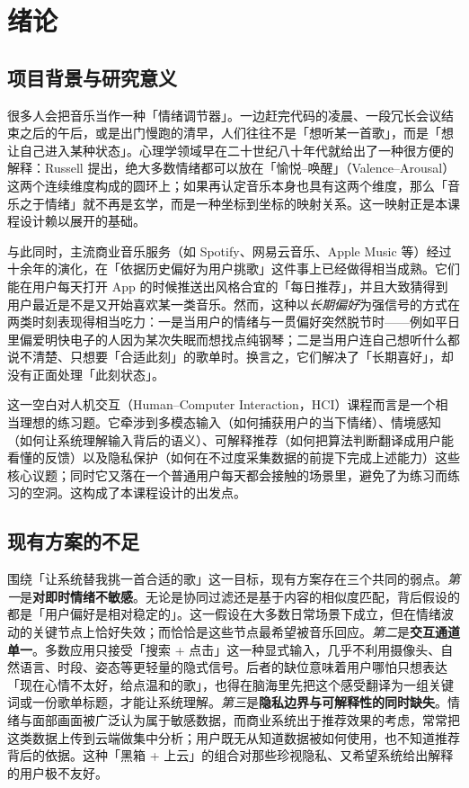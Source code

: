 \chapter{绪论}\label{chap:introduction}

\section{项目背景与研究意义}

很多人会把音乐当作一种「情绪调节器」。一边赶完代码的凌晨、一段冗长会议结束之后的午后，或是出门慢跑的清早，人们往往不是「想听某一首歌」，而是「想让自己进入某种状态」。心理学领域早在二十世纪八十年代就给出了一种很方便的解释：Russell 提出，绝大多数情绪都可以放在「愉悦--唤醒」（Valence--Arousal）这两个连续维度构成的圆环上\cite{russell1980circumplex}；如果再认定音乐本身也具有这两个维度，那么「音乐之于情绪」就不再是玄学，而是一种坐标到坐标的映射关系。这一映射正是本课程设计赖以展开的基础。

与此同时，主流商业音乐服务（如 Spotify、网易云音乐、Apple Music 等）经过十余年的演化，在「依据历史偏好为用户挑歌」这件事上已经做得相当成熟\cite{ricci2015recommender}。它们能在用户每天打开 App 的时候推送出风格合宜的「每日推荐」，并且大致猜得到用户最近是不是又开始喜欢某一类音乐。然而，这种以\emph{长期偏好}为强信号的方式在两类时刻表现得相当吃力：一是当用户的情绪与一贯偏好突然脱节时——例如平日里偏爱明快电子的人因为某次失眠而想找点纯钢琴；二是当用户连自己想听什么都说不清楚、只想要「合适此刻」的歌单时。换言之，它们解决了「长期喜好」，却没有正面处理「此刻状态」。

这一空白对人机交互（Human--Computer Interaction，HCI）课程而言是一个相当理想的练习题。它牵涉到多模态输入（如何捕获用户的当下情绪）、情境感知（如何让系统理解输入背后的语义）、可解释推荐（如何把算法判断翻译成用户能看懂的反馈）以及隐私保护（如何在不过度采集数据的前提下完成上述能力）这些核心议题；同时它又落在一个普通用户每天都会接触的场景里，避免了为练习而练习的空洞。这构成了本课程设计的出发点。

\section{现有方案的不足}

围绕「让系统替我挑一首合适的歌」这一目标，现有方案存在三个共同的弱点。\emph{第一}是\textbf{对即时情绪不敏感}。无论是协同过滤还是基于内容的相似度匹配，背后假设的都是「用户偏好是相对稳定的」。这一假设在大多数日常场景下成立，但在情绪波动的关键节点上恰好失效；而恰恰是这些节点最希望被音乐回应。\emph{第二}是\textbf{交互通道单一}。多数应用只接受「搜索 + 点击」这一种显式输入，几乎不利用摄像头、自然语言、时段、姿态等更轻量的隐式信号。后者的缺位意味着用户哪怕只想表达「现在心情不太好，给点温和的歌」，也得在脑海里先把这个感受翻译为一组关键词或一份歌单标题，才能让系统理解。\emph{第三}是\textbf{隐私边界与可解释性的同时缺失}。情绪与面部画面被广泛认为属于敏感数据，而商业系统出于推荐效果的考虑，常常把这类数据上传到云端做集中分析；用户既无从知道数据被如何使用，也不知道推荐背后的依据。这种「黑箱 + 上云」的组合对那些珍视隐私、又希望系统给出解释的用户极不友好。

